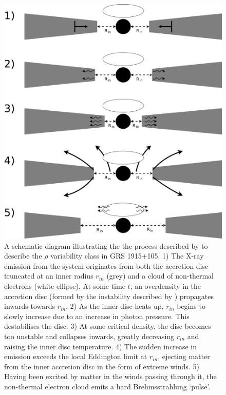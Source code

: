 \pagebreak
\begin{figure}
  \centering
  \includegraphics[width=.9\linewidth, trim= 25mm 0mm 0mm 0mm]{images/Wind_Model1.eps}
  \caption[A schematic diagram illustrating the the process described by \citet{Neilsen_GRSModel} to describe the $\rho$ variability class in GRS 1915+105.]{A schematic diagram illustrating the the process described by \citet{Neilsen_GRSModel} to describe the $\rho$ variability class in GRS 1915+105.  1) The X-ray emission from the system originates from both the accretion disc truncated at an inner radius $r_{in}$ (grey) and a cloud of non-thermal electrons (white ellipse).  At some time $t$, an overdensity in the accretion disc (formed by the instability described by \citet{Shakura_Instab}) propagates inwards towards $r_{in}$.  2) As the inner disc heats up, $r_{in}$ begins to slowly increase due to an increase in photon pressure.  This destabilises the disc.  3) At some critical density, the disc becomes too unstable and collapses inwards, greatly decreasing $r_{in}$ and raising the inner disc temperature.  4) The sudden increase in emission exceeds the local Eddington limit at $r_{in}$, ejecting matter from the inner accretion disc in the form of extreme winds.  5) Having been excited by matter in the winds passing through it, the non-thermal electron cloud emits a hard Brehmsstrahlung `pulse'.}
  \label{fig:WindsModel}
\end{figure}
\pagebreak

